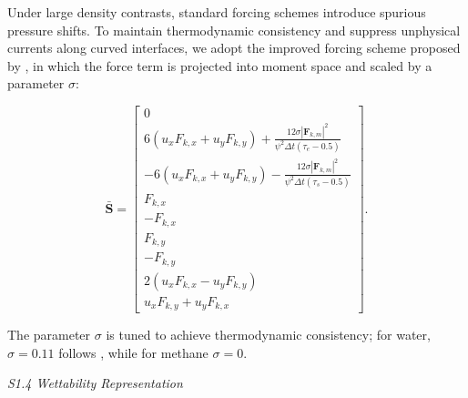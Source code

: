 \documentclass[draft,wrr]{agutexSI2019}
\begin{document}
\begin{article}
Under large density contrasts, standard forcing schemes introduce spurious
pressure shifts. To maintain thermodynamic consistency and suppress unphysical
currents along curved interfaces, we adopt the improved forcing scheme proposed
by , in which the force term is projected into moment
space and scaled by a parameter $\sigma$:
\begin{linenomath*}
\begin{equation}
\label{eq:moment_force}
\bar{\mathbf{S}}
=
\begin{bmatrix}
0 \\
6\left(u_x F_{k,x} + u_y F_{k,y}\right)
+
\displaystyle
\frac{
12\sigma
\left|\mathbf{F}_{k,m}\right|^2
}{
\psi^2 \Delta t \left(\tau_e - 0.5\right)
}
\\[18pt]
-6\left(u_x F_{k,x} + u_y F_{k,y}\right)
-
\displaystyle
\frac{
12\sigma
\left|\mathbf{F}_{k,m}\right|^2
}{
\psi^2 \Delta t \left(\tau_s - 0.5\right)
}
\\[18pt]
F_{k,x} \\
- F_{k,x} \\
F_{k,y} \\
- F_{k,y} \\
2\left(u_x F_{k,x} - u_y F_{k,y}\right) \\
u_x F_{k,y} + u_y F_{k,x}
\end{bmatrix} .
\end{equation}
\end{linenomath*}
The parameter $\sigma$ is tuned to achieve thermodynamic consistency; for water,
$\sigma = 0.11$ follows , while for methane $\sigma = 0$.

\noindent\textit{S1.4 Wettability Representation}


\end{article}
\end{document}
